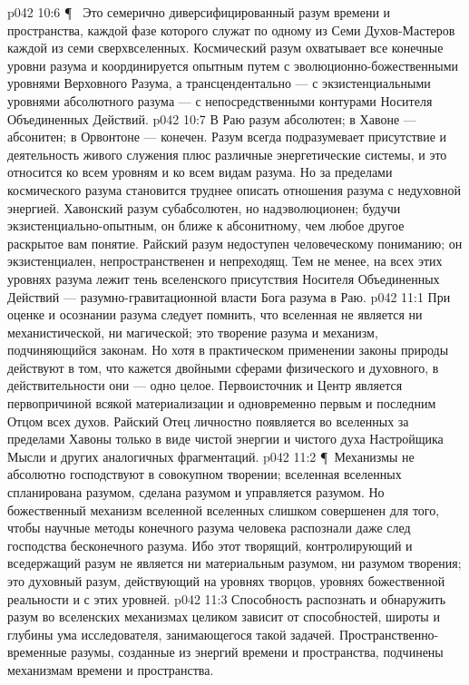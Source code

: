 \vs p042 10:6 \P\ \bibnobreakspace {} Это семерично диверсифицированный разум времени и пространства, каждой фазе которого служат по одному из Семи Духов\hyp{}Мастеров каждой из семи сверхвселенных. Космический разум охватывает все конечные уровни разума и координируется опытным путем с эволюционно\hyp{}божественными уровнями Верховного Разума, а трансцендентально --- с экзистенциальными уровнями абсолютного разума --- с непосредственными контурами Носителя Объединенных Действий.
\vs p042 10:7 В Раю разум абсолютен; в Хавоне --- абсонитен; в Орвонтоне --- конечен. Разум всегда подразумевает присутствие и деятельность живого служения плюс различные энергетические системы, и это относится ко всем уровням и ко всем видам разума. Но за пределами космического разума становится труднее описать отношения разума с недуховной энергией. Хавонский разум субабсолютен, но надэволюционен; будучи экзистенциально\hyp{}опытным, он ближе к абсонитному, чем любое другое раскрытое вам понятие. Райский разум недоступен человеческому пониманию; он экзистенциален, непространственен и непреходящ. Тем не менее, на всех этих уровнях разума лежит тень вселенского присутствия Носителя Объединенных Действий --- разумно\hyp{}гравитационной власти Бога разума в Раю.
\vs p042 11:1 При оценке и осознании разума следует помнить, что вселенная не является ни механистической, ни магической; это творение разума и механизм, подчиняющийся законам. Но хотя в практическом применении законы природы действуют в том, что кажется двойными сферами физического и духовного, в действительности они --- одно целое. Первоисточник и Центр является первопричиной всякой материализации и одновременно первым и последним Отцом всех духов. Райский Отец личностно появляется во вселенных за пределами Хавоны только в виде чистой энергии и чистого духа Настройщика Мысли и других аналогичных фрагментаций.
\vs p042 11:2 \P\ Механизмы не абсолютно господствуют в совокупном творении; вселенная вселенных  спланирована разумом, сделана разумом и управляется разумом. Но божественный механизм вселенной вселенных слишком совершенен для того, чтобы научные методы конечного разума человека распознали даже след господства бесконечного разума. Ибо этот творящий, контролирующий и вседержащий разум не является ни материальным разумом, ни разумом творения; это духовный разум, действующий на уровнях творцов, уровнях божественной реальности и с этих уровней.
\vs p042 11:3 Способность распознать и обнаружить разум во вселенских механизмах целиком зависит от способностей, широты и глубины ума исследователя, занимающегося такой задачей. Пространственно\hyp{}временные разумы, созданные из энергий времени и пространства, подчинены механизмам времени и пространства.
